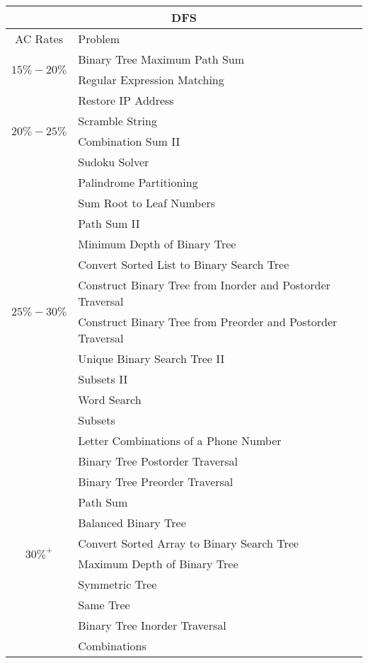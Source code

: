 \documentclass[paper=a4, fontsize=11pt]{scrartcl} %
\begin{document}
\begin{center}
  \begin{tabular}{|c|l|}
      \hline
      \multicolumn{2}{|c|}{DFS} \\
      \hline
      AC Rates      &   Problem     \\
      \hline
      \multirow{2}{*}{$15\%-20\%$}  &    Binary Tree Maximum Path Sum  \\
          & Regular Expression Matching \\
      \hline
      \multirow{4}{*}{$20\%-25\%$}  &    Restore IP Address  \\
          & Scramble String  \\
          & Combination Sum II  \\
          & Sudoku Solver  \\
      \hline
      \multirow{12}{*}{$25\%-30\%$}  &    Palindrome Partitioning  \\
          & Sum Root to Leaf Numbers \\
          & Path Sum II \\
          & Minimum Depth of Binary Tree    \\
          & Convert Sorted List to Binary Search Tree   \\
          & Construct Binary Tree from Inorder and Postorder Traversal  \\
          & Construct Binary Tree from Preorder and Postorder Traversal  \\
          & Unique Binary Search Tree II    \\
          & Subsets II  \\
          & Word Search \\
          & Subsets \\
          & Letter Combinations of a Phone Number   \\
      \hline
      \multirow{10}{*}{$30\%^+$}  &  Binary Tree Postorder Traversal    \\
          & Binary Tree Preorder Traversal  \\
          & Path Sum    \\
          & Balanced Binary Tree    \\
          & Convert Sorted Array to Binary Search Tree  \\
          & Maximum Depth of Binary Tree    \\
          & Symmetric Tree  \\
          & Same Tree   \\
          & Binary Tree Inorder Traversal   \\
          & Combinations    \\
      \hline
  \end{tabular}


\end{center}
\end{document}
